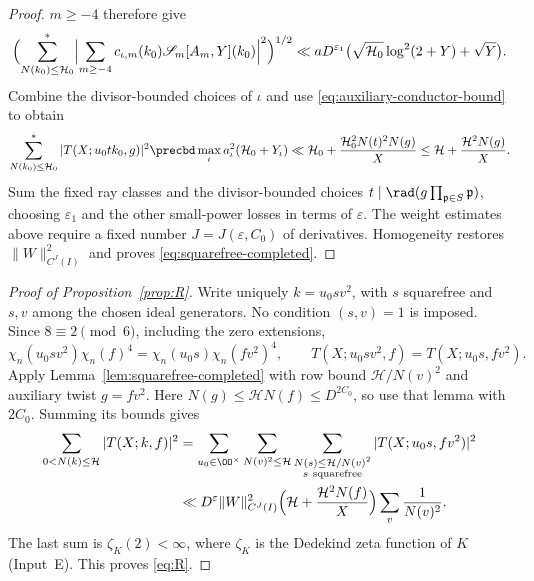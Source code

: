 \begin{proof}
$m\ge-4$ therefore give
\[
 \Bigl(\sum_{N(k_0)\le\mathcal H_0}^*
   \Bigl|\sum_{m\ge-4}c_{\iota,m}(k_0)
       \mathscr S_m[A_m,Y](k_0)\Bigr|^2\Bigr)^{1/2}
 \ll aD^{\varepsilon_1}
       \bigl(\sqrt{\mathcal H_0}\log^2(2+Y)+\sqrt Y\bigr).
\]
Combine the divisor-bounded choices of $\iota$ and use
\eqref{eq:auxiliary-conductor-bound} to obtain
\[
 \sum_{N(k_0)\le\mathcal H_0}^*|T(X;u_0tk_0,g)|^2
 \precbd\max_\iota a_\iota^2(\mathcal H_0+Y_\iota)
 \ll\mathcal H_0+\frac{\mathcal H_0^2N(t)^2N(g)}X
 \le\mathcal H+\frac{\mathcal H^2N(g)}X.
\]
Sum the fixed ray classes and the divisor-bounded choices
$t\mid\rad(g\prod_{\mathfrak p\in S}\mathfrak p)$, choosing
$\varepsilon_1$ and the other small-power losses in terms of
$\varepsilon$. The weight estimates above require a fixed number
$J=J(\varepsilon,C_0)$ of derivatives. Homogeneity restores
$\|W\|_{C^J(I)}^2$ and proves \eqref{eq:squarefree-completed}.
\end{proof}

\begin{proof}[Proof of Proposition~\ref{prop:R}]
Write uniquely $k=u_0sv^2$, with $s$ squarefree and $s,v$ among
the chosen ideal generators. No condition $(s,v)=1$ is imposed.
Since $8\equiv2\pmod6$, including the zero extensions,
\[
 \chi_n(u_0sv^2)\chi_n(f)^4
 =\chi_n(u_0s)\chi_n(fv^2)^4,\qquad
 T(X;u_0sv^2,f)=T(X;u_0s,fv^2).
\]
Apply Lemma~\ref{lem:squarefree-completed} with row bound
$\mathcal H/N(v)^2$ and auxiliary twist $g=fv^2$.
Here $N(g)\le\mathcal H N(f)\le D^{2C_0}$, so use that lemma
with $2C_0$. Summing its bounds gives
\[
 \begin{aligned}
 \sum_{0<N(k)\le\mathcal H}|T(X;k,f)|^2
 &=\sum_{u_0\in\OO^\times}\sum_{N(v)^2\le\mathcal H}
   \sum_{\substack{N(s)\le\mathcal H/N(v)^2\\s\ {\rm squarefree}}}
   |T(X;u_0s,fv^2)|^2\\
 &\ll D^\varepsilon\|W\|_{C^J(I)}^2
   \Bigl(\mathcal H+\frac{\mathcal H^2N(f)}X\Bigr)
   \sum_v\frac1{N(v)^2}.
 \end{aligned}
\]
The last sum is $\zeta_K(2)<\infty$, where $\zeta_K$ is the Dedekind zeta function of $K$ (Input~E). This proves \eqref{eq:R}.
\end{proof}



